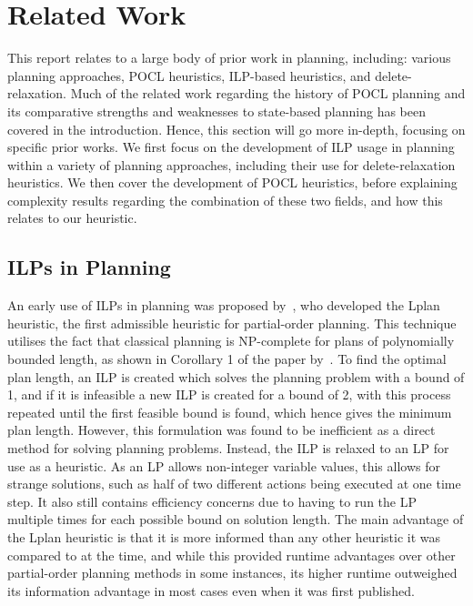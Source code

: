 \chapter{Related Work}\label{chap:relatedWork}

This report relates to a large body of prior work in planning, including: various planning approaches, POCL heuristics, ILP-based heuristics, and delete-relaxation. Much of the related work regarding the history of POCL planning and its comparative strengths and weaknesses to state-based planning has been covered in the introduction. Hence, this section will go more in-depth, focusing on specific prior works. We first focus on the development of ILP usage in planning within a variety of planning approaches, including their use for delete-relaxation heuristics. We then cover the development of POCL heuristics, before explaining complexity results regarding the combination of these two fields, and how this relates to our heuristic.

\section{ILPs in Planning}

An early use of ILPs in planning was proposed by~\cite{Bylander1997LplanHeuristic}, who developed the Lplan heuristic, the first admissible heuristic for partial-order planning. This technique utilises the fact that classical planning is NP-complete for plans of polynomially bounded length, as shown in Corollary 1 of the paper by~\cite{Turner2002PolynomialBoundedPlans}. To find the optimal plan length, an ILP is created which solves the planning problem with a bound of 1, and if it is infeasible a new ILP is created for a bound of 2, with this process repeated until the first feasible bound is found, which hence gives the minimum plan length. However, this formulation was found to be inefficient as a direct method for solving planning problems. Instead, the ILP is relaxed to an LP for use as a heuristic. As an LP allows non-integer variable values, this allows for strange solutions, such as half of two different actions being executed at one time step. It also still contains efficiency concerns due to having to run the LP multiple times for each possible bound on solution length. The main advantage of the Lplan heuristic is that it is more informed than any other heuristic it was compared to at the time, and while this provided runtime advantages over other partial-order planning methods in some instances, its higher runtime outweighed its information advantage in most cases even when it was first published.\\


